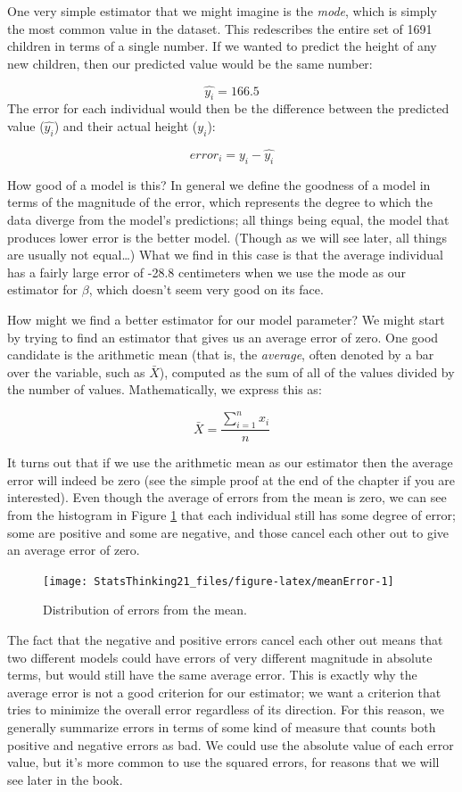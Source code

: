 \documentclass[
  12pt,
]{book}
\begin{document}
One very simple estimator that we might imagine is the \emph{mode}, which is simply the most common value in the dataset. This redescribes the entire set of 1691 children in terms of a single number. If we wanted to predict the height of any new children, then our predicted value would be the same number:

\[
\hat{y_i} = 166.5
\]
The error for each individual would then be the difference between the predicted value (\(\hat{y_i}\)) and their actual height (\(y_i\)):

\[
error_i = y_i - \hat{y_i}
\]

How good of a model is this? In general we define the goodness of a model in terms of the magnitude of the error, which represents the degree to which the data diverge from the model's predictions; all things being equal, the model that produces lower error is the better model. (Though as we will see later, all things are usually not equal\ldots)
What we find in this case is that the average individual has a fairly large error of -28.8 centimeters when we use the mode as our estimator for \(\beta\), which doesn't seem very good on its face.

How might we find a better estimator for our model parameter? We might start by trying to find an estimator that gives us an average error of zero. One good candidate is the arithmetic mean (that is, the \emph{average}, often denoted by a bar over the variable, such as \(\bar{X}\)), computed as the sum of all of the values divided by the number of values. Mathematically, we express this as:

\[
\bar{X} = \frac{\sum_{i=1}^{n}x_i}{n}
\]

It turns out that if we use the arithmetic mean as our estimator then the average error will indeed be zero (see the simple proof at the end of the chapter if you are interested). Even though the average of errors from the mean is zero, we can see from the histogram in Figure \ref{fig:meanError} that each individual still has some degree of error; some are positive and some are negative, and those cancel each other out to give an average error of zero.

\begin{figure}
\texttt{[image: StatsThinking21\_files/figure-latex/meanError-1]} \caption{Distribution of errors from the mean.}\label{fig:meanError}
\end{figure}

The fact that the negative and positive errors cancel each other out means that two different models could have errors of very different magnitude in absolute terms, but would still have the same average error. This is exactly why the average error is not a good criterion for our estimator; we want a criterion that tries to minimize the overall error regardless of its direction. For this reason, we generally summarize errors in terms of some kind of measure that counts both positive and negative errors as bad. We could use the absolute value of each error value, but it's more common to use the squared errors, for reasons that we will see later in the book.
\end{document}
